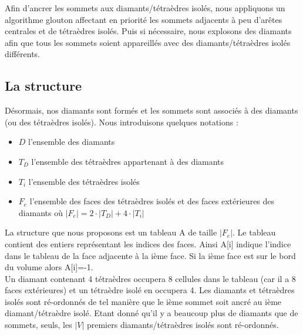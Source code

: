 \noindent
Afin d'ancrer les sommets aux diamants/tétraèdres isolés, nous appliquons un algorithme glouton affectant en priorité les sommets adjacents à peu d'arêtes centrales et de tétraèdres isolés. Puis si nécessaire, nous explosons des diamants afin que tous les sommets soient appareillés avec des diamants/tétraèdres isolés différents.
\subsection{La structure}
\noindent
Désormais, nos diamants sont formés et les sommets sont associés à des diamants (ou des tétraèdres isolés). Nous introduisons quelques notations :
\begin{itemize}
\item $D$ l'ensemble des diamants
\item $T_D$ l'ensemble des tétraèdres appartenant à des diamants
\item $T_i$ l'ensemble des tétraèdres isolés
\item $F_e$ l'ensemble des faces des tétraèdres isolés et des faces extérieures des diamants où $|F_e|=2\cdot |T_D|+4\cdot |T_i|$\\
\end{itemize}
\noindent
La structure que nous proposons est un tableau A de taille $|F_e|$. Le tableau contient des entiers représentant les indices des faces. Ainsi A[i] indique l'indice dans le tableau de la face adjacente à la ième face. Si la ième face est sur le bord du volume alors A[i]=-1.\\ 
Un diamant contenant 4 tétraèdres occupera 8 cellules dans le tableau (car il a 8 faces extérieures) et un tétraèdre isolé en occupera 4. Les diamants et tétraèdres isolés sont ré-ordonnés de tel manière que le ième sommet soit ancré au ième diamant/tétraèdre isolé. Etant donné qu'il y a beaucoup plus de diamants que de sommets, seuls, les $|V|$ premiers diamants/tétraèdres isolés sont ré-ordonnés.\\
